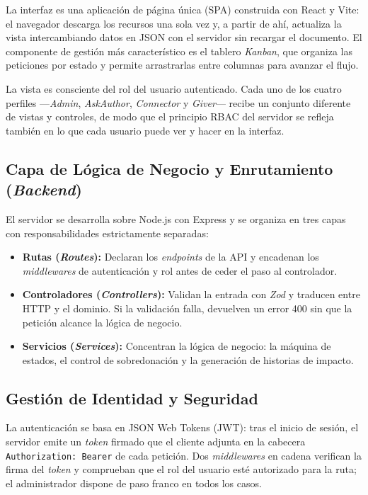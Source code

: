 \documentclass[11pt,oneside,spanish,listoffigures,listoftables]{tfgetsinf}
\begin{document}
La interfaz es una aplicación de página única (SPA) construida con React y Vite: el navegador descarga los recursos una sola vez y, a partir de ahí, actualiza la vista intercambiando datos en JSON con el servidor sin recargar el documento. El componente de gestión más característico es el tablero \textit{Kanban}, que organiza las peticiones por estado y permite arrastrarlas entre columnas para avanzar el flujo.

La vista es consciente del rol del usuario autenticado. Cada uno de los cuatro perfiles —\textit{Admin}, \textit{AskAuthor}, \textit{Connector} y \textit{Giver}— recibe un conjunto diferente de vistas y controles, de modo que el principio RBAC del servidor se refleja también en lo que cada usuario puede ver y hacer en la interfaz.

\subsection{Capa de Lógica de Negocio y Enrutamiento (\textit{Backend})}
El servidor se desarrolla sobre Node.js con Express y se organiza en tres capas con responsabilidades estrictamente separadas:

\begin{itemize}
    \item \textbf{Rutas (\textit{Routes}):} Declaran los \textit{endpoints} de la API y encadenan los \textit{middlewares} de autenticación y rol antes de ceder el paso al controlador.
    \item \textbf{Controladores (\textit{Controllers}):} Validan la entrada con \textit{Zod} y traducen entre HTTP y el dominio. Si la validación falla, devuelven un error 400 sin que la petición alcance la lógica de negocio.
    \item \textbf{Servicios (\textit{Services}):} Concentran la lógica de negocio: la máquina de estados, el control de sobredonación y la generación de historias de impacto.
\end{itemize}

\subsection{Gestión de Identidad y Seguridad}
La autenticación se basa en JSON Web Tokens (JWT): tras el inicio de sesión, el servidor emite un \textit{token} firmado que el cliente adjunta en la cabecera \texttt{Authorization: Bearer} de cada petición. Dos \textit{middlewares} en cadena verifican la firma del \textit{token} y comprueban que el rol del usuario esté autorizado para la ruta; el administrador dispone de paso franco en todos los casos.
\end{document}
